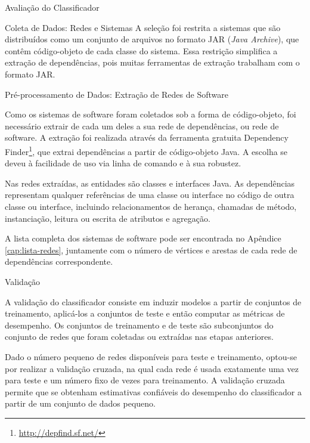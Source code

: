 \begin{section}{Avaliação do Classificador}
\begin{subsection}{Coleta de Dados: Redes e Sistemas}
			A seleção foi restrita a sistemas que são distribuídos como um conjunto de arquivos no formato JAR (\emph{Java Archive}), que contêm código-objeto de cada classe do sistema. Essa restrição simplifica a extração de dependências, pois muitas ferramentas de extração trabalham com o formato JAR.

\end{subsection}

\begin{subsection}{Pré-processamento de Dados: Extração de Redes de Software}

	Como os sistemas de software foram coletados sob a forma de código-objeto, foi necessário extrair de cada um deles a sua rede de dependências, ou rede de software. A extração foi realizada através da ferramenta gratuita Dependency Finder\footnote{\url{http://depfind.sf.net/}}, que extrai dependências a partir de código-objeto Java. A escolha se deveu à facilidade de uso via linha de comando e à sua robustez.

	Nas redes extraídas, as entidades são classes e interfaces Java. As dependências representam qualquer referências de uma classe ou interface no código de outra classe ou interface, incluindo relacionamentos de herança, chamadas de método, instanciação, leitura ou escrita de atributos e agregação.

			A lista completa dos sistemas de software pode ser encontrada no Apêndice \ref{cap:lista-redes}, juntamente com o número de vértices e arestas de cada rede de dependências correspondente.

\end{subsection}

\begin{subsection}{Validação}

	A validação do classificador consiste em induzir modelos a partir de conjuntos de treinamento, aplicá-los a conjuntos de teste e então computar as métricas de desempenho. Os conjuntos de treinamento e de teste são subconjuntos do conjunto de redes que foram coletadas ou extraídas nas etapas anteriores.
	
	Dado o número pequeno de redes disponíveis para teste e treinamento, optou-se por realizar a validação cruzada, na qual cada rede é usada exatamente uma vez para teste e um número fixo de vezes para treinamento. A validação cruzada permite que se obtenham estimativas confiáveis do desempenho do classificador a partir de um conjunto de dados pequeno.
	


\end{subsection}
\end{section}
